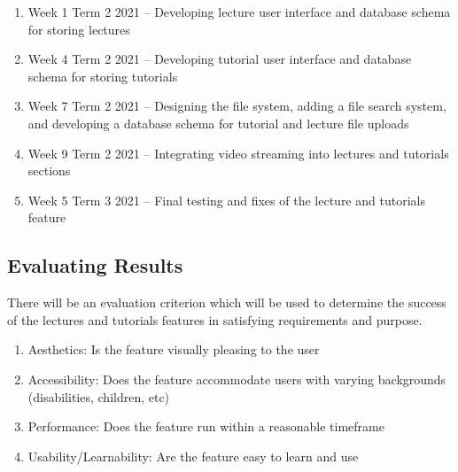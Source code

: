 \begin{enumerate}
\item Week 1 Term 2 2021 – Developing lecture user interface and database schema for storing lectures
\item Week 4 Term 2 2021 – Developing tutorial user interface and database schema for storing tutorials
\item Week 7 Term 2 2021 – Designing the file system, adding a file search system, and developing a database schema for tutorial and lecture file uploads
\item Week 9 Term 2 2021 – Integrating video streaming into lectures and tutorials sections
\item Week 5 Term 3 2021 – Final testing and fixes of the lecture and tutorials feature
\end{enumerate}

\subsection{Evaluating Results}
There will be an evaluation criterion which will be used to determine the success of the lectures and tutorials features in satisfying requirements and purpose.

\begin{enumerate}
    \item Aesthetics: Is the feature visually pleasing to the user
    \item Accessibility: Does the feature accommodate users with varying backgrounds (disabilities, children, etc)
    \item Performance: Does the feature run within a reasonable timeframe
    \item Usability/Learnability: Are the feature easy to learn and use
\end{enumerate}